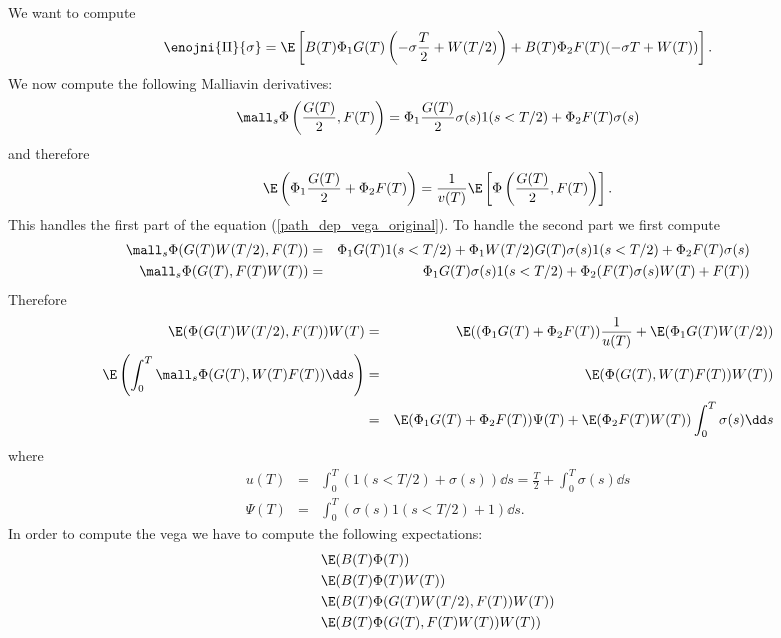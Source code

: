 We want to compute 
\begin {eqnarray}
  \enojni {\Pi} {\sigma} = \E \left[ 
    B(T) \Phi_1 G(T) \left( - \sigma \frac T 2 + W (T/2) \right)
    + B(T) \Phi_2 F(T) ( - \sigma T + W (T) ) 
    \right] .
  \label {path_dep_vega_original}
\end {eqnarray}
We now compute the following Malliavin derivatives:
\begin {eqnarray*}
  \mall_s \Phi \left( \frac {G(T)}{2}, F(T) \right) = 
  \Phi_1 \frac {G(T)} 2 \sigma (s) 1 (s < T/2) + 
  \Phi_2 F(T) \sigma (s) 
\end {eqnarray*}
and therefore 
\begin {eqnarray*}
  \E \left( \Phi_1 \frac {G(T)} 2 + \Phi_2 F(T) \right) = \frac 1 {v(T)} 
  \E \left[ \Phi \left( \frac {G(T)} 2, F(T) \right) \right] .
\end {eqnarray*}
This handles the first part of the equation (\ref{path_dep_vega_original}). 
To handle the second part we first compute 
\begin {eqnarray*}
  \mall_s \Phi ( G(T) W(T/2) , F(T) ) & = &
  \Phi_1 G(T) 1 (s < T/2) + \Phi_1 W(T/2) G(T) \sigma (s) 1 (s < T/2) + 
  \Phi_2 F(T) \sigma (s) 
  \\
  \mall_s \Phi ( G(T) , F(T) W(T) ) & = &
  \Phi_1 G(T) \sigma (s) 1 (s < T/2) + \Phi_2 ( F(T) \sigma (s) W(T) + F(T) ) 
\end {eqnarray*}
Therefore 
\begin {eqnarray*}
  \E ( \Phi ( G(T) W(T/2) , F(T) ) W(T) & = & 
  \E ( ( \Phi_1 G(T) + \Phi_2 F(T) ) \frac 1 {u(T)} + \E ( \Phi_1 G(T) W(T/2) )
  \\
  \E \left( \int_0^T \mall_s \Phi ( G(T) , W(T) F(T) ) \dd s \right) & = &
  \E ( \Phi (G(T), W(T) F(T) ) W(T) ) 
  \\
  & = & 
  \E ( \Phi_1 G(T) + \Phi_2 F(T) ) \Psi (T) + 
  \E ( \Phi_2 F(T) W(T) ) \int_0^T \sigma (s) \dd s 
\end {eqnarray*}
where 
\begin {eqnarray*}
  u(T) & = & \int_0^T (1(s < T/2) + \sigma (s) ) \dd s = \frac T 2 + \int_0^T \sigma (s) \dd s 
  \\
  \Psi (T) & = & \int_0^T ( \sigma (s) 1 (s < T/2) + 1 ) \dd s . 
\end {eqnarray*}
In order to compute the vega we have to compute the following expectations:
\begin {eqnarray*} 
  & \E ( B(T) \Phi (T) ) 
  \\
  & \E ( B(T) \Phi (T) W(T) ) 
  \\
  & \E ( B(T) \Phi ( G(T) W(T/2) , F(T) ) W(T) ) 
  \\
  & \E ( B(T) \Phi ( G(T), F(T) W(T) ) W(T) ) 
\end {eqnarray*}



